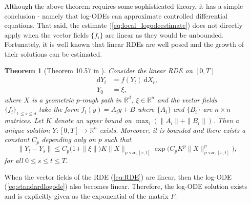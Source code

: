 \documentclass{article}
\newcommand{\R}{\mathbb{R}}
\newtheorem{theorem}{Theorem}[section]
\newcommand{\dby}{\mathrm{d}}
\begin{document}
Although the above theorem requires some sophisticated theory, it has a simple conclusion - namely
that log-ODEs can approximate controlled differential equations. That said, the estimate (\ref{eq:local_logodeestimate}) does not directly apply when the vector fields $\{f_i\}$ are linear as they would be unbounded. Fortunately, it is well known that linear RDEs are well posed and the growth of their solutions can be estimated.
\begin{theorem}[Theorem 10.57 in \citet{friz2010multidimensional}]\label{thm:linearexistance}
Consider the linear RDE on $[0,T]$
\begin{align*}
\dby Y_t & = f(Y_t)\,\dby X_t,\\
Y_0 & = \xi,
\end{align*}
where $X$ is a geometric $p$-rough path in $\R^d$, $\xi\in\R^n$ and the vector fields $\{f_i\}_{1\leq i\leq d}$ take the form $f_i(y) = A_i y + B$ where $\{A_{i}\}$ and $\{B_i\}$ are $n\times n$ matrices. Let $K$ denote an upper bound on $\max_i (\|A_i\| + \|B_i\|)$. Then a unique solution $Y:[0,T]\rightarrow\R^n$ exists. Moreover, it is bounded and there exists a constant $C_p$ depending only on $p$ such that
\begin{equation}
\|Y_t - Y_s\| \leq C_p\big(1+\|\xi\|\big)K\|X\|_{p\text{-var};[s,t]}\exp\Big(C_p K^p \|X\|_{p\text{-var};[s,t]}^p\Big),
\label{eq:linearRDEbound}
\end{equation}
for all $0\leq s\leq t\leq T$.
\end{theorem}

When the vector fields of the RDE (\ref{eq:RDE}) are linear, then the log-ODE (\ref{eq:standardlogode}) also becomes linear. Therefore, the log-ODE solution exists and is explicitly given as the exponential of the matrix $F$.
\end{document}
